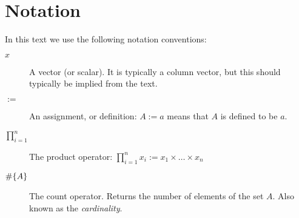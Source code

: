 


\chapter{Notation}
\label{apx:notation}

In this text we use the following notation conventions:
\begin{description}
\item[$x$] A vector (or scalar). It is typically a column vector, but this should typically be implied from the text.
\item[$:=$] An assignment, or definition: $A:=a$ means that $A$ is defined to be $a$. 
\item[$\prod_{i=1}^{n}$] The product operator: $\prod_{i=1}^{n} x_i:= x_1 \times \dots \times x_n$
\item[$\#\{ A \}$] The count operator. Returns the number of elements of the set $A$. Also known as the \emph{cardinality}.

\end{description}


